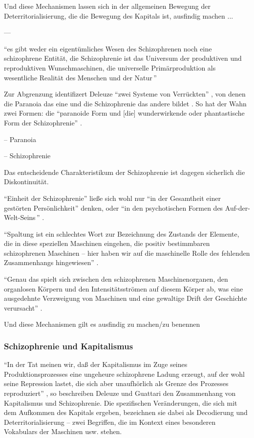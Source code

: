 \documentclass[12pt,
               DIV13,
               paper=a4,
               twoside=false,
               onehalfspacing,
               bibliography=totoc,
               toc=graduated,
               draft,
               ]{scrartcl}
\newcommand{\pc}[2]{\parencite[#1]{#2}}
\newcommand{\vgl}[2]{\parencite[vgl.][#1]{#2}}
\newcommand{\worries}[1]{\ifdraft{\textcolor{blue}{\texttt{(#1)}}}{}}
\begin{document}
Und diese Mechanismen lassen sich in der allgemeinen Bewegung der
Deterritorialisierung, die die Bewegung des Kapitals ist, ausfindig
machen ...

---

"`es gibt weder ein eigentümliches Wesen des Schizophrenen noch eine
schizophrene Entität, die Schizophrenie ist das Universum der
produktiven und reproduktiven Wunschmaschinen, die universelle
Primärproduktion als \glq wesentliche Realität des Menschen und der
Natur\grq\,"' \pc{11}{ao}

Zur Abgrenzung identifizert Deleuze "`zwei Systeme von Verrückten"'
\pc{12}{zweisys}, von denen die Paranoia das eine und die
Schizophrenie das andere bildet \vgl{S. 14 f.}{zweisys}. So hat der
Wahn \worries{?} zwei Formen: die "`paranoide Form und [die]
wunderwirkende oder phantastische Form der Schizophrenie"' \pc{S. 21
f.}{schizg}.

-- Paranoia

-- Schizophrenie

Das entscheidende Charakteristikum der Schizophrenie ist dagegen
sicherlich die Diskontinuität.

"`Einheit der Schizophrenie"' ließe sich wohl nur "`in der Gesamtheit
einer gestörten Persönlichkeit"' denken, oder "`in den psychotischen
Formen des \glq Auf-der-Welt-Seins\grq\,"' \pc{24}{schizg}.

"`Spaltung ist ein schlechtes Wort zur Bezeichnung des Zustands der
Elemente, die in diese speziellen Maschinen eingehen, die positiv
bestimmbaren schizophrenen Maschinen -- hier haben wir auf die
maschinelle Rolle des fehlenden Zusammenhangs hingewiesen"'
\pc{27}{schizg}.

"`Genau das spielt sich zwischen den schizophrenen Maschinenorganen,
den organlosen Körpern und den Intensitätsströmen auf diesem Körper
ab, was eine ausgedehnte Verzweigung von Maschinen und eine gewaltige
Drift der Geschichte verursacht"' \pc{28}{schizg}.

Und diese Mechanismen gilt es ausfindig zu machen/zu benennen

\subsubsection{Schizophrenie und Kapitalismus}

"`In der Tat meinen wir, daß der Kapitalismus im Zuge seines
Produktionsprozesses eine ungeheure schizophrene Ladung erzeugt, auf
der wohl seine Repression lastet, die sich aber unaufhörlich als
Grenze des Prozesses reproduziert"' \pc{45}{ao}, so beschreiben
Deleuze und Guattari den Zusammenhang von Kapitalismus und
Schizophrenie. Die spezifischen Veränderungen, die sich mit dem
Aufkommen des Kapitals ergeben, bezeichnen sie dabei als Decodierung
und Deterritorialisierung -- zwei Begriffen, die im Kontext eines
besonderen Vokabulars der Maschinen usw. \worries{?} stehen.
\end{document}
